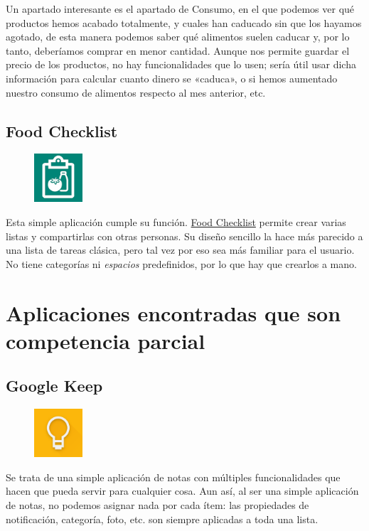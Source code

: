 Un apartado interesante es el apartado de Consumo, en el que podemos ver qué productos hemos acabado totalmente, y cuales han caducado sin que los hayamos agotado, de esta manera podemos saber qué alimentos suelen caducar y, por lo tanto, deberíamos comprar en menor cantidad. Aunque nos permite guardar el precio de los productos, no hay funcionalidades que lo usen; sería útil usar dicha información para calcular cuanto dinero se «caduca», o si hemos aumentado nuestro consumo de alimentos respecto al mes anterior, etc.

\subsection{Food Checklist}
\begin{figure}
\vspace{-.5cm}
\includegraphics[trim,width=1.8cm]{images/foodchecklist.png}
\end{figure}
Esta simple aplicación cumple su función. \href{https://play.google.com/store/apps/details?id=com.chestersw.foodlist}{Food Checklist} permite crear varias listas y compartirlas con otras personas. Su diseño sencillo la hace más parecido a una lista de tareas clásica, pero tal vez por eso sea más familiar para el usuario. No tiene categorías ni \textit{espacios} predefinidos, por lo que hay que crearlos a mano.

\section{Aplicaciones encontradas que son competencia parcial}
\subsection{Google Keep}
\begin{figure}
\vspace{-.5cm}
\includegraphics[width=1.8cm]{images/googlekeep.png}
\end{figure}
Se trata de una simple aplicación de notas con múltiples funcionalidades que hacen que pueda servir para cualquier cosa. Aun así, al ser una simple aplicación de notas, no podemos asignar nada por cada ítem: las propiedades de notificación, categoría, foto, etc. son siempre aplicadas a toda una lista.

